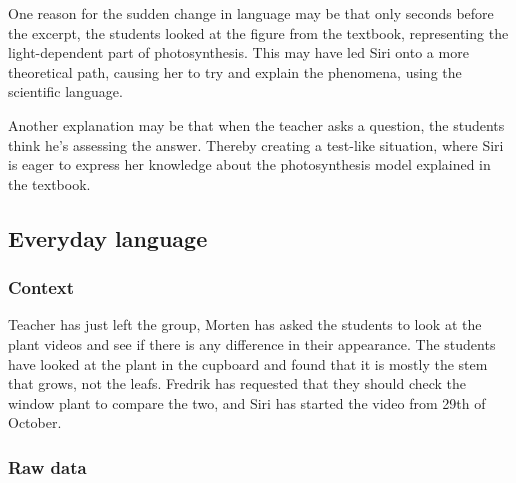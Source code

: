 One reason for the sudden change in language may be that only seconds before the excerpt, the students looked at the figure from the textbook, representing the light-dependent part of photosynthesis. This may have led Siri onto a more theoretical path, causing her to try and explain the phenomena, using the scientific language. 

Another explanation may be that when the teacher asks a question, the students think he's assessing the answer. Thereby creating a test-like situation, where Siri is eager to express her knowledge about the photosynthesis model explained in the textbook. 



\subsection{Everyday language}


\subsubsection*{Context}
Teacher has just left the group, Morten has asked the students to look at the plant videos and see if there is any difference in their appearance. The students have looked at the plant in the cupboard and found that it is mostly the stem that grows, not the leafs. Fredrik has requested that they should check the window plant to compare the two, and Siri has started the video from 29th of October.


\subsubsection*{Raw data}

